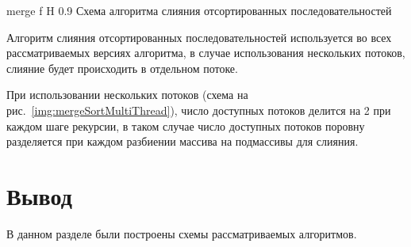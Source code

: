 {merge} %
{f} %
{H} %
{0.9\textwidth} %
{Схема алгоритма слияния отсортированных последовательностей} %

\newpage

Алгоритм слияния отсортированных последовательностей используется во всех рассматриваемых версиях алгоритма, в случае использования нескольких потоков, слияние будет происходить в отдельном потоке.

При использовании нескольких потоков (схема на рис.~\ref{img:mergeSortMultiThread}), число доступных потоков делится на 2 при каждом шаге рекурсии, в таком случае число доступных потоков поровну разделяется при каждом разбиении массива на подмассивы для слияния.

\section*{Вывод}

В данном разделе  были построены схемы рассматриваемых алгоритмов.

